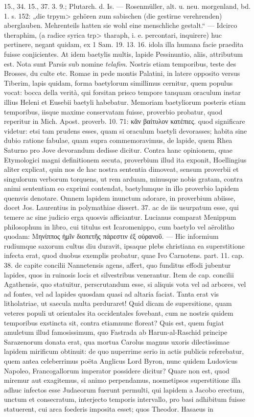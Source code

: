 \documentclass[a4paper, 11pt, oneside, polutonikogreek, german]{article}
\begin{document}
15., 34. 15., 37. 3. 9.; Plutarch. d. Is. --- Rosenmüller, alt. u. neu. morgenland, bd. 1. s. 152: „die \<trpym> gehören zum sabischen (die gestirne verehrenden) aberglauben. Mehrenteils hatten sie wohl eine menschliche gestalt.“ --- Idcirco theraphim, (a radice syrica \<trp> tharaph, i. e. percontari, inquirere) huc pertinere, negant quidam, ex 1 Sam. 19. 13. 16. idola illa humana facie praedita fuisse conjicientes. At idem baetylis multis, lapide Pessinuntio, aliis, attributum est. Nota sunt Parsis sub nomine \emph{telafim}. Nostris etiam temporibus, teste des Brosses, du culte etc. Romae in pede montis Palatini, in latere opposito versus Tiberim, lapis quidam, forma baetylorum simillimus cernitur, quem populus vocat: bocca della verità, qui forsitan prisco tempore tanquam oraculum instar illius Heleni et Eusebii baetyli habebatur. Memoriam baetyliorum posteris etiam temporibus, iisque maxime conservatam fuisse, proverbio probatur, quod reperitur in Mich. Apost. proverb. 10. 71: κἂν βαίτυλον κατέπιες. quod significare videtur: etsi tam prudens esses, quam si oraculum baetyli devorasses; habita sine dubio ratione fabulae, quam supra commemoravimus, de lapide, quem Rhea Saturno pro Jove devorandum dedisse dicitur. Contra hanc opinionem, quae Etymologici magni definitionem secuta, proverbium illud ita exponit, Hoellingius aliter explicat, quin nos de hac nostra sententia dimoveat, sensum proverbii et singulorum verborum torquens, ut rem arduam, minusque nobis gratam, contra animi sententiam eo exprimi contendat, baetylumque in illo proverbio lapidem quemvis denotare. Omnem lapidem inunctum adorare, in proverbium abiisse, docet Jos. Laurentius in polymathiae dissert. 37. ac de iis usurpatum esse, qui temere ac sine judicio erga quosvis afficiantur. Lucianus comparat Menippum philosophum in libro, cui titulus est Icaromenippo, cum baetylo vel aërolitho quodam: Μηνίππος ἡμῖν διοπετῆς πάρεστιν ἐξ οὐρανοῦ. --- Hic informium rudiumque saxorum cultus diu duravit, ipsaque plebs christiana ea superstitione infecta erat, quod duobus exemplis probatur, quae Ivo Carnotens. part. 11. cap. 38. de capite concilii Nannetensis agens, affert, quo funditus effodi jubentur lapides, quos in ruinosis locis et silvestribus venerantur. Item de cap. concilii Agathensis, quo statuitur, perscrutandum esse, si aliquis vota vel ad arbores, vel ad fontes, vel ad lapides quosdam quasi ad altaria faciat. Tanta erat vis litholatriae, ut saecula multa perduraret! Quid dicam de supersitione, quam veteres populi ut orientales ita occidentales fovebant, cum ne nostris quidem temporibus exstincta sit, contra etiamnunc floreat? Quis est, quem fugiat amuletum illud famosissimum, quo Fastrada ab Harun-al-Raschid principe Sarazenorum donata erat, qua mortua Carolus magnus uxoris dilectissimae lapidem mirificum obtinuit: de quo nuperrime serio in actis publicis referebatur, quem antea celeberrimus poëta Anglicus Lord Byron, nunc quidem Ludovicus Napoleo, Francogallorum imperator possidere dicitur? Quare non est, quod miremur aut exagitemus, si animo perpendamus, nosmetipsos superstitione illa adhuc infectos esse Judaeorum fuerunt permulti, qui lapidem a Jacobo erectum, unctum et consecratum, interjecto temporis intervallo, pro basi adhibitum fuisse statuerent, cui arca foederis imposita esset; quos Theodor. Hasaeus in 
\end{document}
